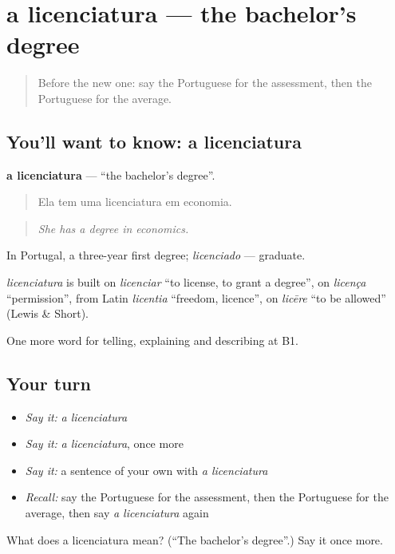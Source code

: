 \section[a licenciatura]{a licenciatura — the bachelor's degree}

\label{lesson:PT-C379-licenciatura}



\begin{quote}
Before the new one: say the Portuguese for the assessment, then the Portuguese for the average.
\end{quote}

\subsection*{You'll want to know: a licenciatura}
\textbf{a licenciatura} — \textquotedblleft{}the bachelor's degree\textquotedblright{}.

\begin{quote}
Ela tem uma licenciatura em economia.
\end{quote}

\begin{quote}
\emph{She has a degree in economics.}
\end{quote}

In Portugal, a three-year first degree; \emph{licenciado} — graduate.

\begin{cousinweb}
\emph{licenciatura} is built on \emph{licenciar} \textquotedblleft{}to license, to grant a degree\textquotedblright{}, on \emph{licença} \textquotedblleft{}permission\textquotedblright{}, from Latin \emph{licentia} \textquotedblleft{}freedom, licence\textquotedblright{}, on \emph{licēre} \textquotedblleft{}to be allowed\textquotedblright{} (Lewis \& Short).
\end{cousinweb}

\begin{grammarlens}[title={What you've built}]
One more word for telling, explaining and describing at B1.
\end{grammarlens}

\subsection*{Your turn}
\begin{itemize}
\raggedright
  \item \emph{Say it:} \emph{a licenciatura}
  \item \emph{Say it:} \emph{a licenciatura}, once more
  \item \emph{Say it:} a sentence of your own with \emph{a licenciatura}
  \item \emph{Recall:} say the Portuguese for the assessment, then the Portuguese for the average, then say \emph{a licenciatura} again
\end{itemize}

\begin{tcolorbox}[breakable,colback=teal!4,colframe=teal!35!black,title={Before you move on}]
What does a licenciatura mean? (\textquotedblleft{}The bachelor's degree\textquotedblright{}.) Say it once more.
\end{tcolorbox}
